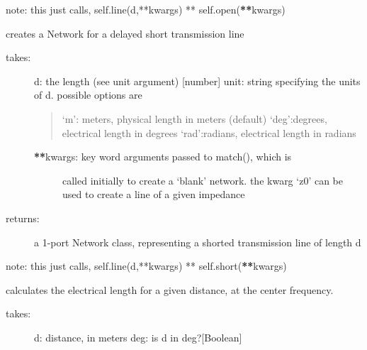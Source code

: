 \documentclass[letterpaper,10pt,english]{sphinxmanual}
\begin{document}
\begin{fulllineitems}
\begin{fulllineitems}
\begin{description}
\end{description}

note: this just calls,
self.line(d,**kwargs) ** self.open({\color{red}\bfseries{}**}kwargs)

\end{fulllineitems}


\begin{fulllineitems}
\label{api/mwavepy.media:mwavepy.media.media.Media.delay_short}
creates a Network for a delayed short transmission line
\begin{description}
\item[{takes:}] \leavevmode
d: the length (see unit argument) {[}number{]}
unit: string specifying the units of d. possible options are
\begin{quote}

`m': meters, physical length in meters (default)
`deg':degrees, electrical length in degrees
`rad':radians, electrical length in radians
\end{quote}
\begin{description}
\item[{{\color{red}\bfseries{}**}kwargs: key word arguments passed to match(), which is }] \leavevmode
called initially to create a `blank' network. the kwarg
`z0' can be used to create a line of a given impedance

\end{description}

\item[{returns:}] \leavevmode
a 1-port Network class, representing a shorted transmission
line of length d

\end{description}

note: this just calls,
self.line(d,**kwargs) ** self.short({\color{red}\bfseries{}**}kwargs)

\end{fulllineitems}


\begin{fulllineitems}
\label{api/mwavepy.media:mwavepy.media.media.Media.electrical_length}
calculates the electrical length for a given distance, at 
the center frequency.
\begin{description}
\item[{takes:}] \leavevmode
d: distance, in meters 
deg: is d in deg?{[}Boolean{]}


\end{description}
\end{fulllineitems}
\end{fulllineitems}
\end{document}
